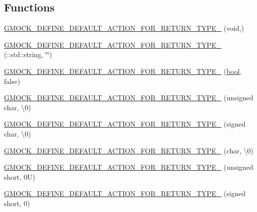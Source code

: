 \subsection*{Functions}
\begin{DoxyCompactItemize}
\item 
\hyperlink{namespacetesting_1_1internal_a8fe6f7c11d6d3dd6e42b75c9a5b43861}{G\+M\+O\+C\+K\+\_\+\+D\+E\+F\+I\+N\+E\+\_\+\+D\+E\+F\+A\+U\+L\+T\+\_\+\+A\+C\+T\+I\+O\+N\+\_\+\+F\+O\+R\+\_\+\+R\+E\+T\+U\+R\+N\+\_\+\+T\+Y\+P\+E\+\_\+} (void,)
\item 
\hyperlink{namespacetesting_1_1internal_a0a961f38f341d40237252babcb3767b7}{G\+M\+O\+C\+K\+\_\+\+D\+E\+F\+I\+N\+E\+\_\+\+D\+E\+F\+A\+U\+L\+T\+\_\+\+A\+C\+T\+I\+O\+N\+\_\+\+F\+O\+R\+\_\+\+R\+E\+T\+U\+R\+N\+\_\+\+T\+Y\+P\+E\+\_\+} (\+::std\+::string, \char`\"{}\char`\"{})
\item 
\hyperlink{namespacetesting_1_1internal_aa6670915f42119e4ba20d8cb74fc1eea}{G\+M\+O\+C\+K\+\_\+\+D\+E\+F\+I\+N\+E\+\_\+\+D\+E\+F\+A\+U\+L\+T\+\_\+\+A\+C\+T\+I\+O\+N\+\_\+\+F\+O\+R\+\_\+\+R\+E\+T\+U\+R\+N\+\_\+\+T\+Y\+P\+E\+\_\+} (\hyperlink{classbool}{bool}, false)
\item 
\hyperlink{namespacetesting_1_1internal_ab203e2c4c54f2ca86439344347a3e43f}{G\+M\+O\+C\+K\+\_\+\+D\+E\+F\+I\+N\+E\+\_\+\+D\+E\+F\+A\+U\+L\+T\+\_\+\+A\+C\+T\+I\+O\+N\+\_\+\+F\+O\+R\+\_\+\+R\+E\+T\+U\+R\+N\+\_\+\+T\+Y\+P\+E\+\_\+} (unsigned char, \textquotesingle{}\textbackslash{}0\textquotesingle{})
\item 
\hyperlink{namespacetesting_1_1internal_aaedb3b1b5307625bc84dc660742da3c6}{G\+M\+O\+C\+K\+\_\+\+D\+E\+F\+I\+N\+E\+\_\+\+D\+E\+F\+A\+U\+L\+T\+\_\+\+A\+C\+T\+I\+O\+N\+\_\+\+F\+O\+R\+\_\+\+R\+E\+T\+U\+R\+N\+\_\+\+T\+Y\+P\+E\+\_\+} (signed char, \textquotesingle{}\textbackslash{}0\textquotesingle{})
\item 
\hyperlink{namespacetesting_1_1internal_aeaaa7101572f283fe70a85ad5e6c65dc}{G\+M\+O\+C\+K\+\_\+\+D\+E\+F\+I\+N\+E\+\_\+\+D\+E\+F\+A\+U\+L\+T\+\_\+\+A\+C\+T\+I\+O\+N\+\_\+\+F\+O\+R\+\_\+\+R\+E\+T\+U\+R\+N\+\_\+\+T\+Y\+P\+E\+\_\+} (char, \textquotesingle{}\textbackslash{}0\textquotesingle{})
\item 
\hyperlink{namespacetesting_1_1internal_ab2965a6078670393812e67f8e5fcb072}{G\+M\+O\+C\+K\+\_\+\+D\+E\+F\+I\+N\+E\+\_\+\+D\+E\+F\+A\+U\+L\+T\+\_\+\+A\+C\+T\+I\+O\+N\+\_\+\+F\+O\+R\+\_\+\+R\+E\+T\+U\+R\+N\+\_\+\+T\+Y\+P\+E\+\_\+} (unsigned short, 0\+U)
\item 
\hyperlink{namespacetesting_1_1internal_ae6ea5db83b290e2412f321c3b1eb8c47}{G\+M\+O\+C\+K\+\_\+\+D\+E\+F\+I\+N\+E\+\_\+\+D\+E\+F\+A\+U\+L\+T\+\_\+\+A\+C\+T\+I\+O\+N\+\_\+\+F\+O\+R\+\_\+\+R\+E\+T\+U\+R\+N\+\_\+\+T\+Y\+P\+E\+\_\+} (signed short, 0)

\end{DoxyCompactItemize}

